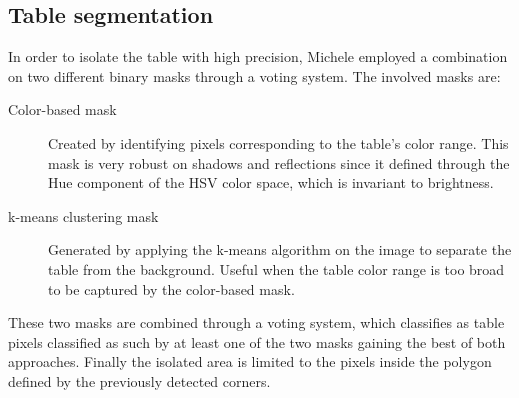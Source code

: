 \subsection{Table segmentation}

In order to isolate the table with high precision, Michele employed a combination on two different binary masks through a voting system.
The involved masks are:
\begin{description}
	\item[Color-based mask] Created by identifying pixels corresponding to the table's color range. This mask is very robust on shadows and reflections since it defined through the Hue component of the HSV color space, which is invariant to brightness.
	\item[k-means clustering mask] Generated by applying the k-means algorithm on the image to separate the table from the background. Useful when the table color range is too broad to be captured by the color-based mask.
\end{description}
These two masks are combined through a voting system, which classifies as table pixels classified as such by at least one of the two masks gaining the best of both approaches.
Finally the isolated area is limited to the pixels inside the polygon defined by the previously detected corners.

